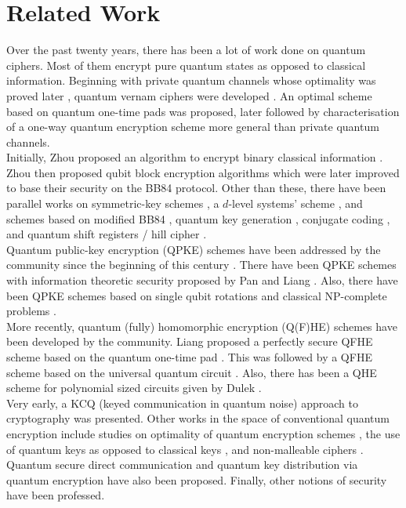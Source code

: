 \section{Related Work}

Over the past twenty years, there has been a lot of work done on quantum ciphers. Most of them encrypt pure quantum states as opposed to classical information. Beginning with private quantum channels \cite{pqc} whose optimality was proved later \cite{pqc-optimality}, quantum vernam ciphers were developed \cite{qe-vernam}. An optimal scheme based on quantum one-time pads \cite{qe-optimal} was proposed, later followed by characterisation of a one-way quantum encryption scheme \cite{qe-perfect} more general than private quantum channels. \\
Initially, Zhou proposed an algorithm to encrypt binary classical information \cite{qe-realqu}. Zhou then proposed qubit block encryption algorithms \cite{qbe-zhou,qbe-hk-zhou} which were later improved \cite{qe-improve-cao} to base their security on the BB84 protocol. Other than these, there have been parallel works on symmetric-key schemes \cite{qe-symmetric,qe-symm2}, a $d$-level systems' scheme \cite{qe-dlev}, and schemes based on modified BB84 \cite{qe-modbb84}, quantum key generation \cite{qbe-qkg}, conjugate coding \cite{qe-prob}, and quantum shift registers / hill cipher \cite{qe-qsrhc}. \\
Quantum public-key encryption (QPKE) schemes have been addressed by the community since the beginning of this century \cite{qpke-okamoto}. There have been QPKE schemes with information theoretic security proposed by Pan \cite{qpke-itsec-pan} and Liang \cite{qpke-itsec-liang,qpke-itsec2-liang}. Also, there have been QPKE schemes based on single qubit rotations \cite{qpke-qurot,qpke-qurot-sec} and classical NP-complete problems \cite{qpke-npc}. \\
More recently, quantum (fully) homomorphic encryption (Q(F)HE) schemes have been developed by the community. Liang proposed a perfectly secure QFHE scheme based on the quantum one-time pad \cite{qfhe-perfect}. This was followed by a QFHE scheme based on the universal quantum circuit \cite{qfhe-uqc}. Also, there has been a QHE scheme for polynomial sized circuits given by Dulek \cite{qhe-polyc}. \\
Very early, a KCQ (keyed communication in quantum noise) approach to cryptography \cite{kcq} was presented. Other works in the space of conventional quantum encryption include studies on optimality of quantum encryption schemes \cite{qe-optimality}, the use of quantum keys as opposed to classical keys \cite{qe-quantkeys}, and non-malleable ciphers \cite{nonmalleable}. Quantum secure direct communication \cite{qsdc-qe} and quantum key distribution \cite{qkd-via-qe} via quantum encryption have also been proposed. Finally, other notions of security \cite{qe-semsec-xiang,oram-sec} have been professed.